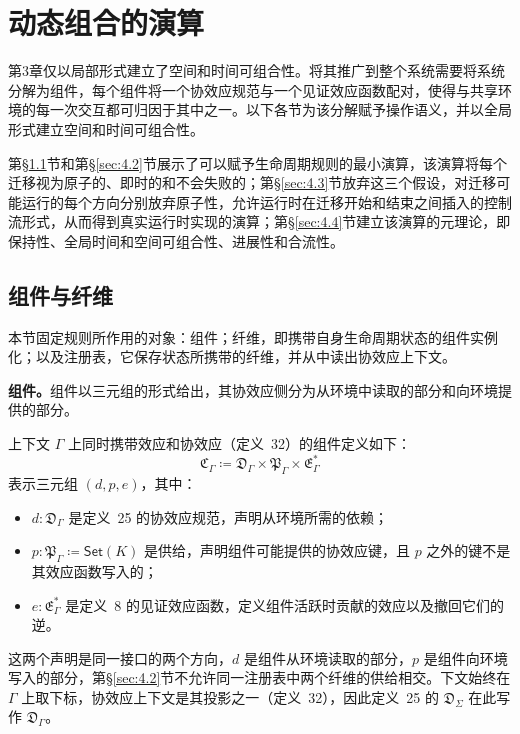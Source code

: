\section{动态组合的演算}\label{sec:4}

第3章仅以局部形式建立了空间和时间可组合性。将其推广到整个系统需要将系统分解为组件，每个组件将一个协效应规范与一个见证效应函数配对，使得与共享环境的每一次交互都可归因于其中之一。以下各节为该分解赋予操作语义，并以全局形式建立空间和时间可组合性。

第\S\ref{sec:4.1}节和第\S\ref{sec:4.2}节展示了可以赋予生命周期规则的最小演算，该演算将每个迁移视为原子的、即时的和不会失败的；第\S\ref{sec:4.3}节放弃这三个假设，对迁移可能运行的每个方向分别放弃原子性，允许运行时在迁移开始和结束之间插入的控制流形式，从而得到真实运行时实现的演算；第\S\ref{sec:4.4}节建立该演算的元理论，即保持性、全局时间和空间可组合性、进展性和合流性。

\subsection{组件与纤维}\label{sec:4.1}

本节固定规则所作用的对象：组件；纤维，即携带自身生命周期状态的组件实例化；以及注册表，它保存状态所携带的纤维，并从中读出协效应上下文。

\textbf{组件。}组件以三元组的形式给出，其协效应侧分为从环境中读取的部分和向环境提供的部分。

\begin{definition}\label{def:4.1}
上下文 $\Gamma$ 上同时携带效应和协效应（定义~32）的组件定义如下：
\begin{equation}\label{eq:4.1}
\mathfrak{C}_\Gamma \coloneqq \mathfrak{D}_\Gamma \times \mathfrak{P}_\Gamma \times \mathfrak{E}^*_\Gamma
\end{equation}
表示三元组 $(d, p, e)$，其中：
\begin{itemize}
\item $d: \mathfrak{D}_\Gamma$ 是定义~25 的协效应规范，声明从环境所需的依赖；
\item $p: \mathfrak{P}_\Gamma \coloneqq \mathsf{Set}(K)$ 是供给，声明组件可能提供的协效应键，且 $p$ 之外的键不是其效应函数写入的；
\item $e: \mathfrak{E}^*_\Gamma$ 是定义~8 的见证效应函数，定义组件活跃时贡献的效应以及撤回它们的逆。
\end{itemize}
\end{definition}

这两个声明是同一接口的两个方向，$d$ 是组件从环境读取的部分，$p$ 是组件向环境写入的部分，第\S\ref{sec:4.2}节不允许同一注册表中两个纤维的供给相交。下文始终在 $\Gamma$ 上取下标，协效应上下文是其投影之一（定义~32），因此定义~25 的 $\mathfrak{D}_\Sigma$ 在此写作 $\mathfrak{D}_\Gamma$。

